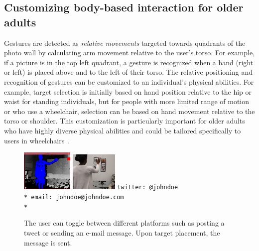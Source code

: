 \documentclass{chi-ext}
\begin{document}
\subsection{Customizing body-based interaction for older adults}
Gestures are detected as \emph{relative movements} targeted towards quadrants of the photo wall by calculating arm movement relative to the user's torso. For example, if a picture is in the top left quadrant, a gesture is recognized when a hand (right or left) is placed above and to the left of their torso. The relative positioning and recognition of gestures can be customized to an individual's physical abilities. For example, target selection is initially based on hand position relative to the hip or waist for standing individuals, but for people with more limited range of motion or who use a wheelchair, selection can be based on hand movement relative to the torso or shoulder. This customization is particularly important for older adults who have highly diverse physical abilities and could be tailored specifically to users in wheelchairs~\cite{gerling:2013}. 

\begin{figure}
    \centering
    \includegraphics[width=0.22\textwidth]{depthtracking.png} \includegraphics[width=0.2\textwidth]{backwallshot.png}
	\texttt{twitter: @johndoe \\*
	email: johndoe@johndoe.com \\*}    
    \caption{The user can toggle between different platforms such as posting a tweet or sending an e-mail message. Upon target placement, the message is sent.}
	 \label{fig:tracking}
\end{figure}
\end{document}
